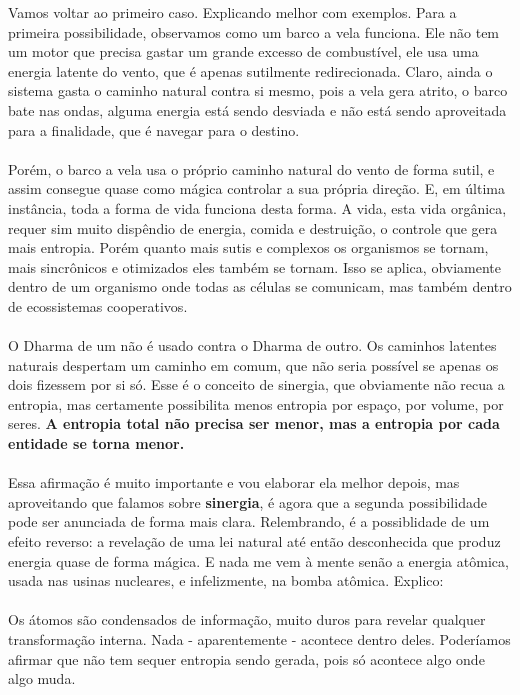 \documentclass[11pt]{article}
\begin{document}
Vamos voltar ao primeiro caso. Explicando melhor com exemplos. Para a primeira possibilidade, observamos como um barco a vela funciona. Ele não tem um motor que precisa gastar um grande excesso de combustível, ele usa uma energia latente do vento, que é apenas sutilmente redirecionada. Claro, ainda o sistema gasta o caminho natural contra si mesmo, pois a vela gera atrito, o barco bate nas ondas, alguma energia está sendo desviada e não está sendo aproveitada para a finalidade, que é navegar para o destino.\\\\

Porém, o barco a vela usa o próprio caminho natural do vento de forma sutil, e assim consegue quase como mágica controlar a sua própria direção. E, em última instância, toda a forma de vida funciona desta forma. A vida, esta vida orgânica, requer sim muito dispêndio de energia, comida e destruição, o controle que gera mais entropia. Porém quanto mais sutis e complexos os organismos se tornam, mais sincrônicos e otimizados eles também se tornam. Isso se aplica, obviamente dentro de um organismo onde todas as células se comunicam, mas também dentro de ecossistemas cooperativos.\\\\

O Dharma de um não é usado contra o Dharma de outro. Os caminhos latentes naturais despertam um caminho em comum, que não seria possível se apenas os dois fizessem por si só. Esse é o conceito de sinergia, que obviamente não recua a entropia, mas certamente possibilita menos entropia por espaço, por volume, por seres. \textbf{A entropia total não precisa ser menor, mas a entropia por cada entidade se torna menor.}\\\\

Essa afirmação é muito importante e vou elaborar ela melhor depois, mas aproveitando que falamos sobre \textbf{sinergia}, é agora que a segunda possibilidade pode ser anunciada de forma mais clara. Relembrando, é a possiblidade de um efeito reverso: a revelação de uma lei natural até então desconhecida que produz energia quase de forma mágica. E nada me vem à mente senão a energia atômica, usada nas usinas nucleares, e infelizmente, na bomba atômica. Explico:\\\\

Os átomos são condensados de informação, muito duros para revelar qualquer transformação interna. Nada - aparentemente - acontece dentro deles. Poderíamos afirmar que não tem sequer entropia sendo gerada, pois só acontece algo onde algo muda. \\\\
\end{document}
